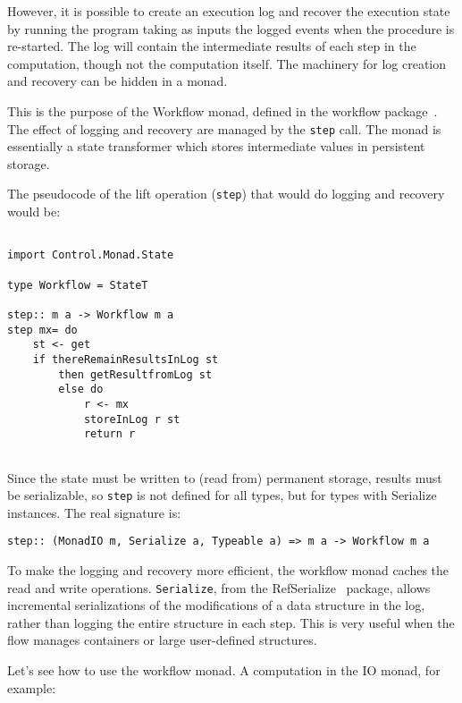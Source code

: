 \documentclass{tmr}
\begin{document}
However, it is possible to create an execution log and recover the execution state by running the program taking as inputs the logged events when the procedure is re-started. The log will contain the intermediate results of each step in the computation, though not the computation itself. The machinery for log creation and recovery can be hidden in a monad. 

This is the purpose of the Workflow monad, defined in the workflow package~\cite{auth:workflow}. The effect of logging and recovery are managed by the {\tt step} call. The monad is essentially a state transformer which stores intermediate values in persistent storage. 
 
The pseudocode of the lift operation ({\tt step}) that would do 
logging and recovery would be: 
 
{\tt 
 
\begin{verbatim} 
 
import Control.Monad.State 
 
type Workflow = StateT 
 
step:: m a -> Workflow m a 
step mx= do 
    st <- get 
    if thereRemainResultsInLog st 
        then getResultfromLog st 
        else do 
            r <- mx 
            storeInLog r st 
            return r 
 
\end{verbatim} 
 
} 
 
Since the  state must be written to (read from) permanent storage, results must be serializable, so {\tt step} is not defined for all types, but for types with Serialize instances. The real signature is: 
 
{\tt 
 
\begin{verbatim} 
step:: (MonadIO m, Serialize a, Typeable a) => m a -> Workflow m a 
\end{verbatim} 
 
} 
 
 
To make the logging and recovery more efficient, the workflow monad caches the read and write operations.  {\tt Serialize}, from the RefSerialize~\cite{auth:refserialize} package, allows incremental serializations of the modifications of a data structure in the log, rather than logging the entire structure in each step. This is very useful when the flow manages containers or large user-defined structures.
 
Let's see how to use the workflow monad. A computation in the IO monad, for example: 
 
\end{document}

